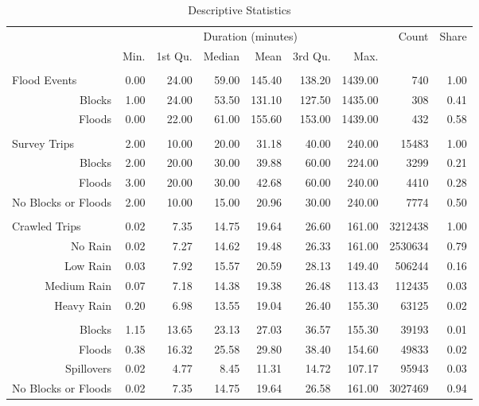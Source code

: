\begin{table}[!htbp]
\centering
\caption{Descriptive Statistics} 
\label{table:desc-stats}
\begin{tabular}{lrrrrrrrr}
  \hline
  \hline
  & \multicolumn{6}{c}{Duration (minutes)} & Count & Share \\
 &  Min.    &  1st Qu. &  Median  &  Mean    &  3rd Qu. &  Max.     \\ 
  \hline\\[-1.8ex] 
 Flood Events & 0.00 & 24.00 & 59.00 & 145.40 & 138.20 & 1439.00 & 740 & 1.00 \\
    \multicolumn{1}{r}{Blocks} & 1.00 & 24.00 & 53.50 & 131.10 & 127.50 & 1435.00 & 308 & 0.41 \\ 
    \multicolumn{1}{r}{Floods} & 0.00   &   22.00   &   61.00   &  155.60   &  153.00   & 1439.00   & 432 & 0.58 \\
    & \\
Survey Trips & 2.00 & 10.00 & 20.00 & 31.18 & 40.00 & 240.00 & 15483 & 1.00 \\ 
  \multicolumn{1}{r}{Blocks} & 2.00 & 20.00 & 30.00 & 39.88 & 60.00 & 224.00 & 3299 & 0.21 \\
  \multicolumn{1}{r}{Floods} & 3.00 & 20.00 & 30.00 & 42.68 & 60.00 & 240.00 & 4410 & 0.28 \\
  \multicolumn{1}{r}{No Blocks or Floods} &   2.00   &  10.00   &  15.00   &  20.96   &  30.00   & 240.00   & 7774 & 0.50 \\ 
  & \\
Crawled Trips & 0.02 & 7.35 & 14.75 & 19.64 & 26.60 & 161.00 & 3212438 & 1.00 \\ 
  \multicolumn{1}{r}{No Rain} & 0.02 & 7.27 & 14.62 & 19.48 & 26.33 & 161.00 & 2530634 & 0.79 \\ 
  \multicolumn{1}{r}{Low Rain} & 0.03 & 7.92 & 15.57 & 20.59 & 28.13 & 149.40 & 506244 & 0.16 \\ 
  \multicolumn{1}{r}{Medium Rain} & 0.07 & 7.18 & 14.38 & 19.38 & 26.48 & 113.43 & 112435 & 0.03 \\ 
  \multicolumn{1}{r}{Heavy Rain} & 0.20 & 6.98 & 13.55 & 19.04 & 26.40 & 155.30 & 63125 & 0.02 \\ 
  & \\
  \multicolumn{1}{r}{Blocks} & 1.15 & 13.65 & 23.13 & 27.03 & 36.57 & 155.30 & 39193 & 0.01 \\ 
  \multicolumn{1}{r}{Floods} & 0.38 & 16.32 & 25.58 & 29.80 & 38.40 & 154.60 & 49833 & 0.02 \\ 
  \multicolumn{1}{r}{Spillovers} & 0.02 & 4.77 & 8.45 & 11.31 & 14.72 & 107.17 & 95943 & 0.03 \\ 
\multicolumn{1}{r}{No Blocks or Floods} &   0.02   &   7.35  &  14.75   &  19.64   &  26.58   & 161.00   & 3027469 & 0.94 \\[1.8ex] 
   \hline
   \hline
\end{tabular}
\end{table}
